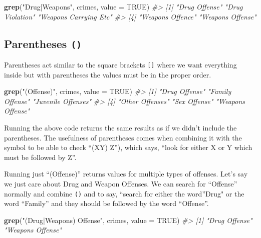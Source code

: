 \documentclass[
  12pt,
]{book}
\newenvironment{Shaded}{\begin{snugshade}}{\end{snugshade}}
\newcommand{\CommentTok}[1]{\textcolor[rgb]{0.37,0.37,0.37}{\textit{#1}}}
\newcommand{\DataTypeTok}[1]{\textcolor[rgb]{0.27,0.27,0.27}{#1}}
\newcommand{\KeywordTok}[1]{\textcolor[rgb]{0.27,0.27,0.27}{\textbf{#1}}}
\newcommand{\NormalTok}[1]{#1}
\newcommand{\OtherTok}[1]{\textcolor[rgb]{0.37,0.37,0.37}{#1}}
\newcommand{\StringTok}[1]{\textcolor[rgb]{0.5,0.5,0.5}{#1}}
\begin{document}
\begin{Shaded}
\begin{Highlighting}[]
\KeywordTok{grep}\NormalTok{(}\StringTok{"Drug|Weapons"}\NormalTok{, crimes, }\DataTypeTok{value =} \OtherTok{TRUE}\NormalTok{)}
\CommentTok{\#\textgreater{} [1] "Drug Offense"         "Drug Violation"       "Weapons Carrying Etc"}
\CommentTok{\#\textgreater{} [4] "Weapons Offence"      "Weapons Offense"}
\end{Highlighting}
\end{Shaded}

\hypertarget{parentheses}{%
\subsection{\texorpdfstring{Parentheses \texttt{()}}{Parentheses ()}}\label{parentheses}}

Parentheses act similar to the square brackets \texttt{{[}{]}} where we want everything inside but with parentheses the values must be in the proper order.

\begin{Shaded}
\begin{Highlighting}[]
\KeywordTok{grep}\NormalTok{(}\StringTok{"(Offense)"}\NormalTok{, crimes, }\DataTypeTok{value =} \OtherTok{TRUE}\NormalTok{)}
\CommentTok{\#\textgreater{} [1] "Drug Offense"      "Family Offense"    "Juvenile Offenses"}
\CommentTok{\#\textgreater{} [4] "Other Offenses"    "Sex Offense"       "Weapons Offense"}
\end{Highlighting}
\end{Shaded}

Running the above code returns the same results as if we didn't include the parentheses. The usefulness of parentheses comes when combining it with the \texttt{\textbar{}} symbol to be able to check ``(X\textbar Y) Z''), which says, ``look for either X or Y which must be followed by Z''.

Running just ``(Offense)'' returns values for multiple types of offenses. Let's say we just care about Drug and Weapon Offenses. We can search for ``Offense'' normally and combine \texttt{()} and \texttt{\textbar{}} to say, ``search for either the word''Drug" or the word ``Family'' and they should be followed by the word ``Offense''.

\begin{Shaded}
\begin{Highlighting}[]
\KeywordTok{grep}\NormalTok{(}\StringTok{"(Drug|Weapons) Offense"}\NormalTok{, crimes, }\DataTypeTok{value =} \OtherTok{TRUE}\NormalTok{)}
\CommentTok{\#\textgreater{} [1] "Drug Offense"    "Weapons Offense"}
\end{Highlighting}
\end{Shaded}
\end{document}
